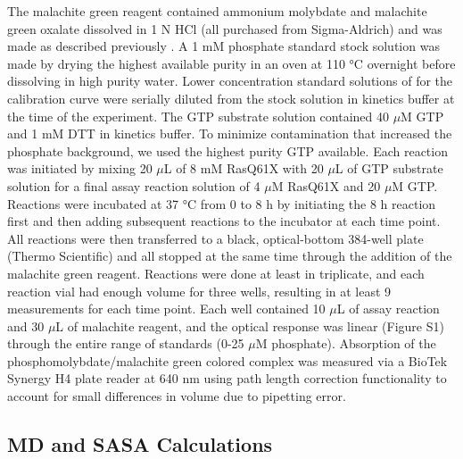 The malachite green reagent contained ammonium molybdate and malachite green oxalate dissolved in 1 N HCl (all purchased from Sigma-Aldrich) and was made as described previously \cite{Quan2005}.
A 1 mM phosphate standard stock solution was made by drying the highest available purity  in an oven at 110 \si{\celsius} overnight before dissolving in high purity water. 
Lower concentration standard solutions of  for the calibration curve were serially diluted from the stock solution in kinetics buffer at the time of the experiment. 
The GTP substrate solution contained 40 $\mu$M GTP and 1 mM DTT in kinetics buffer. 
To minimize contamination that increased the phosphate background, we used the highest purity GTP available. 
Each reaction was initiated by mixing 20 $\mu$L of 8 mM RasQ61X with 20 $\mu$L of GTP substrate solution for a final assay reaction solution of 4 $\mu$M RasQ61X and 20 $\mu$M GTP. 
Reactions were incubated at 37 \si{\celsius} from 0 to 8 h by initiating the 8 h reaction first and then adding subsequent reactions to the incubator at each time point. 
All reactions were then transferred to a black, optical-bottom 384-well plate (Thermo Scientific) and all stopped at the same time through the addition of the malachite green reagent. 
Reactions were done at least in triplicate, and each reaction vial had enough volume for three wells, resulting in at least 9 measurements for each time point. 
Each well contained 10 $\mu$L of assay reaction and 30 $\mu$L of malachite reagent, and the optical response was linear (Figure S1) through the entire range of standards (0-25 $\mu$M phosphate). 
Absorption of the phosphomolybdate/malachite green colored complex was measured via a BioTek Synergy H4 plate reader at 640 nm using path length correction functionality to account for small differences in volume due to pipetting error.

\subsection{MD and SASA Calculations} 


